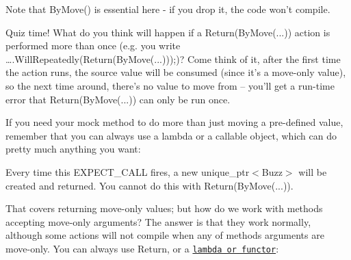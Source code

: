 \begin{DoxyCode}{0}
\DoxyCodeLine{\textcolor{comment}{// When this fires, the unique\_ptr<> specified by ByMove(...) will}}
\DoxyCodeLine{\textcolor{comment}{// be returned.}}
\DoxyCodeLine{}
\end{DoxyCode}


Note that {\ttfamily By\+Move()} is essential here -\/ if you drop it, the code won’t compile.

Quiz time! What do you think will happen if a {\ttfamily Return(\+By\+Move(...))} action is performed more than once (e.\+g. you write {\ttfamily ….\+Will\+Repeatedly(Return(\+By\+Move(...)));})? Come think of it, after the first time the action runs, the source value will be consumed (since it’s a move-\/only value), so the next time around, there’s no value to move from -- you’ll get a run-\/time error that {\ttfamily Return(\+By\+Move(...))} can only be run once.

If you need your mock method to do more than just moving a pre-\/defined value, remember that you can always use a lambda or a callable object, which can do pretty much anything you want\+:


\begin{DoxyCode}{0}
\DoxyCodeLine{    \});}
\DoxyCodeLine{}
\end{DoxyCode}


Every time this {\ttfamily E\+X\+P\+E\+C\+T\+\_\+\+C\+A\+LL} fires, a new {\ttfamily unique\+\_\+ptr$<$Buzz$>$} will be created and returned. You cannot do this with {\ttfamily Return(\+By\+Move(...))}.

That covers returning move-\/only values; but how do we work with methods accepting move-\/only arguments? The answer is that they work normally, although some actions will not compile when any of method\textquotesingle{}s arguments are move-\/only. You can always use {\ttfamily Return}, or a \href{#FunctionsAsActions}{\tt lambda or functor}\+:



